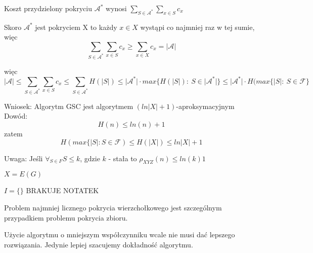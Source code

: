 Koszt przydzielony pokryciu $\mathcal{A}^{\ast}$ wynosi $\sum_{S\in \mathcal{A}^{\ast}}\sum_{x\in S}c_x$

Skoro $\mathcal{A}^{\ast}$ jest pokryciem X to każdy $x \in X$ wystąpi co najmniej raz w tej sumie, więc
$$\sum_{S\in \mathcal{A}^{\ast}}\sum_{x\in S}c_x \geq \sum_{x\in X}c_x = \vert \mathcal{A}\vert$$

więc $$\vert \mathcal{A}\vert \leq \sum_{S\in \mathcal{A}^{\ast}}\sum_{x\in S}c_x \leq \sum_{S\in \mathcal{A}^{\ast}}H(\vert S\vert )\leq \vert \mathcal{A}^{\ast}\vert \cdot max\lbrace H(\vert S\vert):\ S\in \vert \mathcal{A}^{\ast}\vert\rbrace \leq\vert\mathcal{A}^{\ast}\vert \cdot H(max\lbrace\vert S\vert :\ S\in \mathcal{F}\rbrace$$

Wniosek: Algorytm GSC jest algorytmem $(ln\vert X \vert + 1)$-aproksymacyjnym\\
Dowód: 
$$H(n)\leq ln(n)+1$$
zatem
$$H(max\lbrace\vert S\vert :S\in \mathcal{F})\leq H(\vert X\vert )\leq ln\vert X\vert + 1$$

Uwaga: Jeśli $\forall_{S \in F} S \leq k$, gdzie $k$ - stała to $\rho_{XYZ}(n) \leq ln(k) 1$

$X = E(G)$

$I=\{ \}$   BRAKUJE NOTATEK

Problem najmniej licznego pokrycia wierzchołkowego jest szczególnym przypadkiem problemu pokrycia zbioru.

Użycie algorytmu o mniejszym współczynniku wcale nie musi dać lepszego rozwiązania. Jedynie lepiej szacujemy dokładność algorytmu.